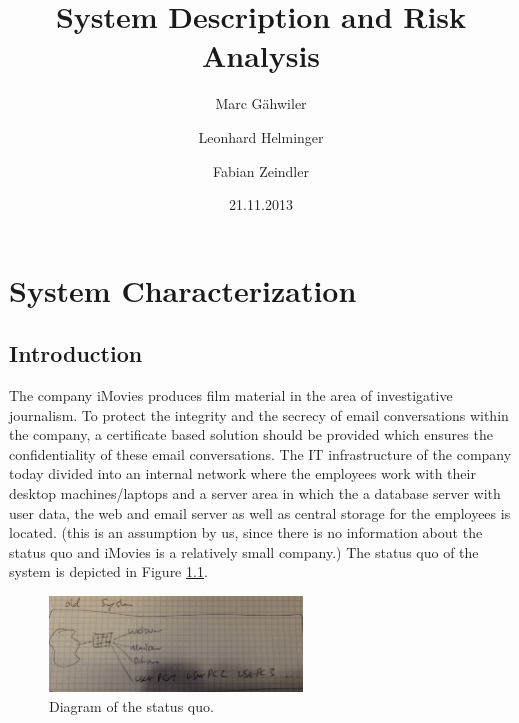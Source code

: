 \documentclass[a4paper, toc=index, 12pt, DIV14, twoside, BCOR2cm, headsepline, numbers=noenddot, bibliography=totoc]{scrbook}
\title{\huge\sffamily\bfseries System Description and Risk Analysis}
\author{Marc G\"ahwiler \and Leonhard Helminger \and Fabian Zeindler}
\date{21.11.2013}
\begin{document}
\maketitle

\tableofcontents
\pagebreak


\chapter{System Characterization}
\section{Introduction}
The company iMovies produces film material in the area of investigative journalism. To protect the integrity and the secrecy of email conversations within the company, a certificate based solution should be provided which ensures the confidentiality of these email conversations. \newline
The IT infrastructure of the company today divided into an internal network where the employees work with their desktop machines/laptops and a server area in which the a database server with user data, the web and email server as well as central storage for the employees is located. (this is an assumption by us, since there is no information about the status quo and iMovies is a relatively small company.) The status quo of the system is depicted in Figure \ref{oldsystem}.
\begin{figure}[H]
  \centering
    \includegraphics[width=0.6\textwidth]{images/oldsystem.jpg}  
  \caption{Diagram of the status quo.}
  \label{oldsystem}
\end{figure}
\end{document}
